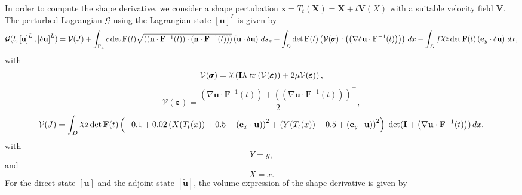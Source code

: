 \documentclass[preview]{standalone}
\let\oldcdot\cdot
\let\cdot\oldcdot
\begin{document}
In order to compute the shape derivative, we consider a shape pertubation $\mathbf x = T_t(\mathbf X) = \mathbf X + t \mathbf  V(X)$ with a suitable velocity field $\mathbf V$. The perturbed Lagrangian $\mathcal G$ using the Lagrangian state $\left[ {\mathbf{ u }}\right]^{L}$ is given by
\begin{dmath*}
\mathcal G(t,\left[ {\mathbf{ u }}\right]^{L},\left[ {\delta\mathbf{  u }}\right]^{L}) = \mathcal V(J) +  \int_{\Gamma_{4}} c  \operatorname{det}\mathbf F( t )  \sqrt{\left( \left( \mathbf n \cdot  \mathbf F^{-1}(t) \right) \cdot \left( \mathbf n \cdot  \mathbf F^{-1}(t) \right) \right)} \left( {\mathbf{ u }} \cdot {\delta\mathbf{  u }} \right) \,ds_x +  \int_{D}  \operatorname{det}\mathbf F( t )  \left( \mathcal V(\pmb \sigma) \mathrel{:} \left( \left(  \nabla {\delta\mathbf{  u }}  \cdot  \mathbf F^{-1}(t) \right) \right)\right) \,dx -  \int_{D} f \raisebox{\depth}{$\chi_2$}  \operatorname{det}\mathbf F( t )  \left( \mathbf e_y \cdot {\delta\mathbf{  u }} \right) \,dx , 
\end{dmath*}
with
\begin{dmath*}
\mathcal V(\pmb \sigma) = \raisebox{\depth}{$\chi$} \left(\mathbf{I} \lambda  \,\operatorname{tr}\left(\mathcal V(\pmb \varepsilon)\right)  + 2 \mu \mathcal V(\pmb \varepsilon)\right),
 \end{dmath*}
\begin{dmath*}
\mathcal V(\pmb \varepsilon) = \frac{\left(  \nabla {\mathbf{ u }}  \cdot  \mathbf F^{-1}(t) \right) +  \left( \left(  \nabla {\mathbf{ u }}  \cdot  \mathbf F^{-1}(t) \right) \right)^\top }{2},
 \end{dmath*}
\begin{dmath*}
\mathcal V(J) =  \int_{D} \raisebox{\depth}{$\chi_2$}  \operatorname{det}\mathbf F( t )  \left(-0.1 + 0.02 \left(X(T_t(x)) + 0.5 + \left( \mathbf e_x \cdot {\mathbf{ u }} \right)\right)^{2} + \left(Y(T_t(x)) - 0.5 + \left( \mathbf e_y \cdot {\mathbf{ u }} \right)\right)^{2}\right)  \;\operatorname{det}(\mathbf{I} + \left(  \nabla {\mathbf{ u }}  \cdot  \mathbf F^{-1}(t) \right))  \,dx.
 \end{dmath*}
with 
\begin{dmath*}
Y = y,\end{dmath*}
and\begin{dmath*}
X = x.\end{dmath*}
For the direct state $\left[ {\mathbf{ u }}\right]$ and the adjoint state $\left[ \tilde{\mathbf{ u }}\right]$, the volume expression of the shape derivative is given by
\end{document}
